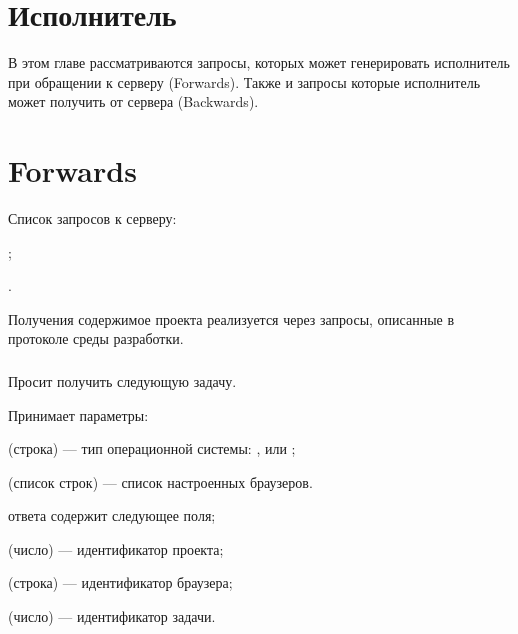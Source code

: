 \section{Исполнитель}

В этом главе рассматриваются запросы, которых может генерировать исполнитель при обращении к серверу (Forwards). Также и запросы которые исполнитель может получить от сервера (Backwards).

\section{Forwards}

Список запросов к серверу:

\begin{icItems}
	\item {};
	\item {}.
\end{icItems}

Получения содержимое проекта реализуется через запросы, описанные в протоколе среды разработки.

\subsubsection{}

Просит получить следующую задачу.

Принимает параметры:
\begin{icItems}
	\item {} (строка) — тип операционной системы: ,  или ;
	\item {} (список строк) — список настроенных браузеров.
\end{icItems}

 ответа содержит следующее поля;
\begin{icItems}
	\item {} (число) — идентификатор проекта;
	\item {} (строка) — идентификатор браузера;
	\item {} (число) — идентификатор задачи.
\end{icItems}

\subsubsection{}

